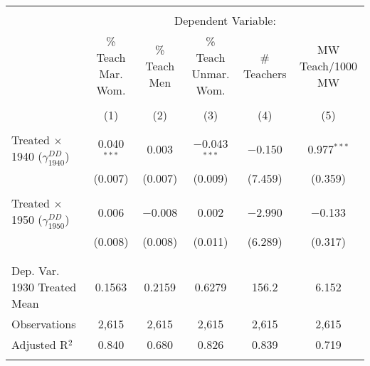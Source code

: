 
\begin{tabular}{@{\extracolsep{5pt}}lccccc} 
\\[-1.8ex]\hline 
\hline \\[-1.8ex] 
 & \multicolumn{5}{c}{Dependent Variable:} \\ 
\cline{2-6} 
 & \% Teach Mar. Wom. & \% Teach Men & \% Teach Unmar. Wom. & \# Teachers & MW Teach/1000 MW \\ 
\\[-1.8ex] & (1) & (2) & (3) & (4) & (5)\\ 
\hline \\[-1.8ex] 
 Treated $\times$ 1940 ($\gamma_{1940}^{DD}$) & 0.040$^{***}$ & 0.003 & $-$0.043$^{***}$ & $-$0.150 & 0.977$^{***}$ \\ 
  & (0.007) & (0.007) & (0.009) & (7.459) & (0.359) \\ 
  & & & & & \\ 
 Treated $\times$ 1950 ($\gamma_{1950}^{DD}$) & 0.006 & $-$0.008 & 0.002 & $-$2.990 & $-$0.133 \\ 
  & (0.008) & (0.008) & (0.011) & (6.289) & (0.317) \\ 
  & & & & & \\ 
\hline \\[-1.8ex] 
Dep. Var. 1930 Treated Mean & 0.1563 & 0.2159 & 0.6279 & 156.2 & 6.152 \\ 
Observations & 2,615 & 2,615 & 2,615 & 2,615 & 2,615 \\ 
Adjusted R$^{2}$ & 0.840 & 0.680 & 0.826 & 0.839 & 0.719 \\ 
\hline 
\hline \\[-1.8ex] 
\end{tabular} 
